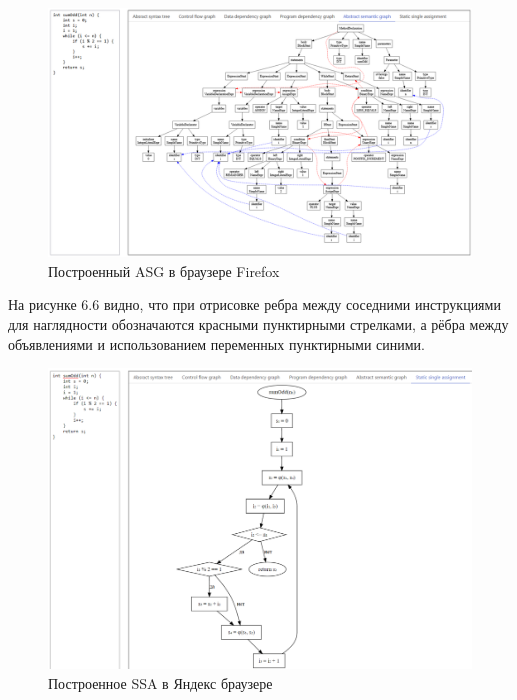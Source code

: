 \begin{figure}[h]
	\center
	\includegraphics [scale=0.55] {my_folder/images/my/25}
	\caption{Построенный ASG в браузере Firefox}
	\label{fig:25}
\end{figure}

На рисунке 6.6 видно, что при отрисовке ребра между соседними инструкциями для наглядности обозначаются красными пунктирными стрелками, а рёбра между объявлениями и использованием переменных пунктирными синими.

\begin{figure}[h]
	\center
	\includegraphics [scale=0.5] {my_folder/images/my/26}
	\caption{Построенное SSA в Яндекс браузере}
	\label{fig:26}
\end{figure}

